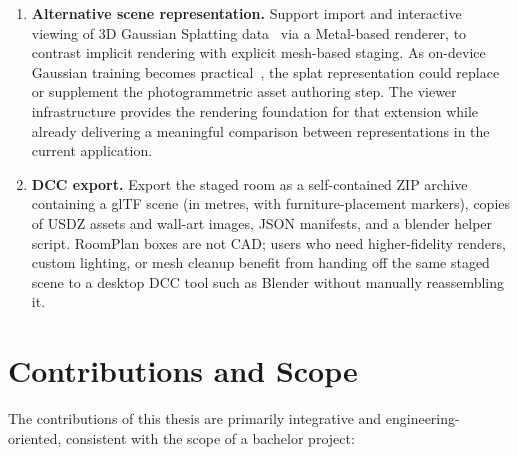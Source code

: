 \begin{enumerate}
  \item \textbf{Alternative scene representation.}
    Support import and interactive viewing of 3D Gaussian Splatting
    data~\cite{kerbl20233dgs} via a Metal-based renderer, to contrast implicit rendering with explicit mesh-based staging.
    As on-device Gaussian training becomes
    practical~\cite{Guo26}, the splat representation could replace or
    supplement the photogrammetric asset authoring step. The viewer
    infrastructure provides the rendering foundation for that extension while
    already delivering a meaningful comparison between representations in the
    current application.

    \item \textbf{DCC export.}
    Export the staged room as a self-contained ZIP archive containing a glTF scene
    (in metres, with furniture-placement markers), copies of USDZ assets and wall-art
    images, JSON manifests, and a blender helper script.
    RoomPlan boxes are not CAD; users who need higher-fidelity
    renders, custom lighting, or mesh cleanup benefit from handing off the same staged
    scene to a desktop DCC tool such as Blender without manually reassembling it.
\end{enumerate}


\section{Contributions and Scope}
\label{sec:intro:contributions}

The contributions of this thesis are primarily integrative and
engineering-oriented, consistent with the scope of a bachelor project:

